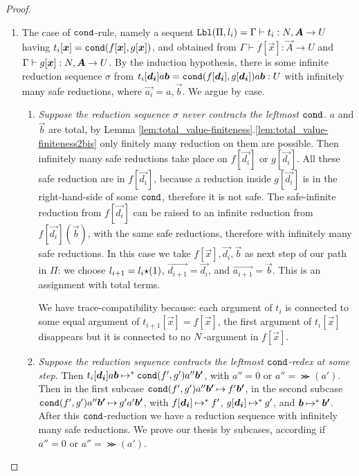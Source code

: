 \begin{proof}
\begin{enumerate}

\item
  The case of ${\tt cond}$-rule, namely a sequent
  $\Label(\Pi,l_i) = \Gamma\vdash t_i:\N,\vec{A}\rightarrow U$
  having $t_i[\vec{x}] = \cond(f[\vec{x}],g[\vec{x}])$,
  and obtained from 
  $\Gamma\vdash f[\vec{x}]:\vec{A}\rightarrow U$
  and
  $\Gamma\vdash g[\vec{x}]:\N,\vec{A}\rightarrow U$. 
  By the induction hypothesis, there is some infinite reduction sequence $\sigma$ from
  $t_i[\vec{d_i}]a \vec{b} = \cond(f[\vec{d_i}],g[\vec{d_i}])a\vec{b}: U$
  with infinitely many safe reductions,
  where $\vec{a_i} = a,\vec{b}$. 
  We argue by case.

\begin{enumerate}
\item
  \emph{Suppose the reduction sequence $\sigma$ never contracts the leftmost ${\tt cond}$.}
  $a$ and $\vec{b}$ are total, 
  by Lemma \ref{lem:total_value-finiteness}.\ref{lem:total_value-finiteness2bis}
  only finitely many reduction on them are possible.
  Then infinitely many safe reductions take place on $f[\vec{d_i}]$ or $g[\vec{d_i}]$. 
  All these safe reduction are in $f[\vec{d_i}]$, because
  a reduction inside $g[\vec{d_i}]$ is in the right-hand-side of some ${\tt cond}$, 
  therefore it is not safe.
  The safe-infinite reduction from $f[\vec{d_i}]$ can be raised to an infinite reduction from 
  $f[\vec{d_i}](\vec{b})$, with the same safe reductions, therefore with infinitely
  many safe reductions.
  In this case we take $f[\vec{x}],\vec{d_i},\vec{b}$ as next step of our path in $\Pi$:
  we choose $l_{i+1} = l_i {\star} (1)$, $\vec{d_{i+1}} = \vec{d_i}$, and
  $\vec{a_{i+1}} = \vec{b}$.  This is an assignment with total terms.

  We have trace-compatibility because: 
  each argument of $t_i$ is connected to some equal argument of 
  $t_{i+1}[\vec{x}]=f[\vec{x}]$,
  the first argument of $t_i[\vec{x}]$ disappears 
  but it is connected to no ${N}$-argument in $f[\vec{x}]$.

\item
  \emph{Suppose the reduction sequence contracts the leftmost ${\tt cond}$-redex at some step.}
  Then $t_i[\vec{d_i}]a \vec{b} \reduces^{*} \cond(f',g')a''\vec{b'}$, 
  with $a'' = 0$ or $a'' = \Succ(a')$. 
  Then in the first subcase $\cond(f',g')a''\vec{b'} \reduces f'\vec{b'}$, in the second subcase
  $\cond(f',g')a''\vec{b'} \reduces g' a' \vec{b'}$, 
  with $f[\vec{d_i}] \reduces^{*} f'$, $g[\vec{d_i}] \reduces^{*} g'$, 
  and $\vec{b} \reduces^{*} \vec{b'}$.
  After this ${\tt cond}$-reduction we have a reduction sequence 
  with infinitely many safe reductions.
  We prove our thesis by subcases, according if $a'' = 0$ or $a'' = \Succ(a')$.
   

\end{enumerate}
\end{enumerate}
\end{proof}
